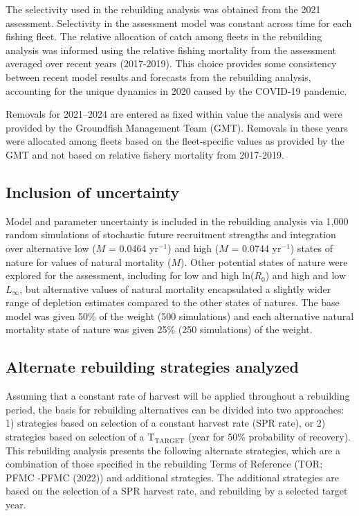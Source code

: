 \documentclass[11pt,
  letterpaper,
]{article}
\begin{document}
The selectivity used in the rebuilding analysis was obtained from the 2021 assessment. Selectivity in the assessment model was constant across time for each fishing fleet. The relative allocation of catch among fleets in the rebuilding analysis was informed using the relative fishing mortality from the assessment averaged over recent years (2017-2019). This choice provides some consistency between recent model results and forecasts from the rebuilding analysis, accounting for the unique dynamics in 2020 caused by the COVID-19 pandemic.

Removals for 2021--2024 are entered as fixed within value the analysis and were provided by the Groundfish Management Team (GMT). Removals in these years were allocated among fleets based on the fleet-specific values as provided by the GMT and not based on relative fishery mortality from 2017-2019.

\hypertarget{inclusion-of-uncertainty}{%
\subsection{Inclusion of uncertainty}\label{inclusion-of-uncertainty}}

Model and parameter uncertainty is included in the rebuilding analysis via 1,000 random simulations of stochastic future recruitment strengths and integration over alternative low (\(M\) = 0.0464 yr\(^{-1}\)) and high (\(M\) = 0.0744 yr\(^{-1}\)) states of nature for values of natural mortality (\(M\)). Other potential states of nature were explored for the assessment, including for low and high ln(\(R_0\)) and high and low \(L_{\infty}\), but alternative values of natural mortality encapsulated a slightly wider range of depletion estimates compared to the other states of natures. The base model was given 50\% of the weight (500 simulations) and each alternative natural mortality state of nature was given 25\% (250 simulations) of the weight.

\hypertarget{alternate-rebuilding-strategies-analyzed}{%
\subsection{Alternate rebuilding strategies analyzed}\label{alternate-rebuilding-strategies-analyzed}}

Assuming that a constant rate of harvest will be applied throughout a rebuilding period, the basis for rebuilding alternatives can be divided into two approaches: 1) strategies based on selection of a constant harvest rate (SPR rate), or 2) strategies based on selection of a \(\text{T}_\text{TARGET}\) (year for 50\% probability of recovery). This rebuilding analysis presents the following alternate strategies, which are a combination of those specified in the rebuilding Terms of Reference (TOR; PFMC -PFMC (2022)) and additional strategies. The additional strategies are based on the selection of a SPR harvest rate, and rebuilding by a selected target year.
\end{document}
